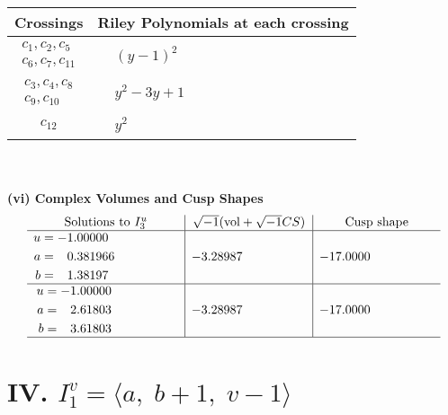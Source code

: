 \documentclass[1p]{elsarticle_modified}
\theoremstyle{definition}
\newcommand{\I}{\sqrt{-1}}
\begin{document}
\begin{tabular}{m{50pt}|m{274pt}}
Crossings & \hspace{64pt}Riley Polynomials at each crossing \\
\hline $$\begin{aligned}c_{1},c_{2},c_{5}\\c_{6},c_{7},c_{11}\end{aligned}$$&$\begin{aligned}
&(y-1)^2
\end{aligned}$\\
\hline $$\begin{aligned}c_{3},c_{4},c_{8}\\c_{9},c_{10}\end{aligned}$$&$\begin{aligned}
&y^2-3 y+1
\end{aligned}$\\
\hline $$\begin{aligned}c_{12}\end{aligned}$$&$\begin{aligned}
&y^2
\end{aligned}$\\
\hline
\end{tabular}\\~\\
\newpage\flushleft \textbf{(vi) Complex Volumes and Cusp Shapes}
$$\begin{array}{c|c|c}  
\text{Solutions to }I^u_{3}& \I (\text{vol} + \sqrt{-1}CS) & \text{Cusp shape}\\
 \hline 
\begin{aligned}
u &= -1.00000\phantom{ +0.000000I} \\
a &= \phantom{-}0.381966\phantom{ +0.000000I} \\
b &= \phantom{-}1.38197\phantom{ +0.000000I}\end{aligned}
 & -3.28987\phantom{ +0.000000I} & -17.0000\phantom{ +0.000000I} \\ \hline\begin{aligned}
u &= -1.00000\phantom{ +0.000000I} \\
a &= \phantom{-}2.61803\phantom{ +0.000000I} \\
b &= \phantom{-}3.61803\phantom{ +0.000000I}\end{aligned}
 & -3.28987\phantom{ +0.000000I} & -17.0000\phantom{ +0.000000I}\\
 \hline 
 \end{array}$$\newpage\newpage\renewcommand{\arraystretch}{1}
\centering \section*{IV. $I^v_{1}= \langle a,\;b+1,\;v-1 \rangle$}
\end{document}
